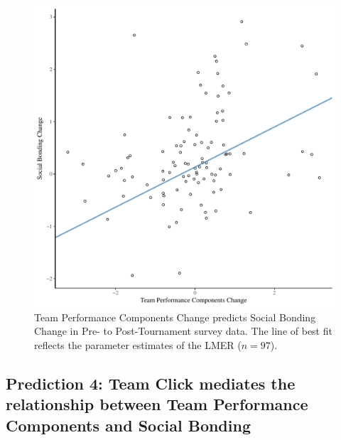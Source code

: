 \begin{CJK}{UTF8}{gbsn}




  \begin{figure}[htbp]
    \centering
  \includegraphics[scale=.5]{images/jasBondDeltaModelSlope.pdf}
    \caption{Team Performance Components Change predicts Social Bonding Change in Pre- to Post-Tournament survey data. The line of best fit reflects the parameter estimates of the LMER ($n = 97$).}
    \label{fig:jasBondDeltaModelSlope}
  \end{figure}








\subsection{Prediction 4: Team Click mediates the relationship between Team Performance Components and Social Bonding}



\end{CJK}
